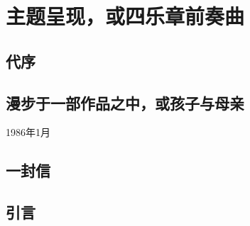 \part{主题呈现，或四乐章前奏曲}

\chapter{代序}

\chapter{漫步于一部作品之中，或孩子与母亲}
1986年1月





















\chapter{一封信}
















\chapter{引言}














